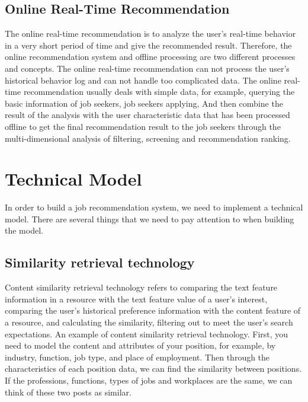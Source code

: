 \documentclass[sigconf]{acmart}
\begin{document}
\subsection{Online Real-Time Recommendation}
The online real-time recommendation is to analyze the user's real-time behavior in a very short period of time and give the recommended result. Therefore, the online recommendation system and offline processing are two different processes and concepts.\cite{Hong2013}  The online real-time recommendation can not process the user's historical behavior log and can not handle too complicated data.\cite{Hong2013}  The online real-time recommendation usually deals with simple data, for example, querying the basic information of job seekers, job seekers applying, And then combine the result of the analysis with the user characteristic data that has been processed offline to get the final recommendation result to the job seekers through the multi-dimensional analysis of filtering, screening and recommendation ranking.


\section{Technical Model}
In order to build a job recommendation system, we need to implement a technical model. There are several things that we need to pay attention to when building the model.

\subsection{Similarity retrieval technology}
Content similarity retrieval technology refers to comparing the text feature information in a resource with the text feature value of a user's interest, comparing the user's historical preference information with the content feature of a resource, and calculating the similarity, filtering out to meet the user's search expectations.\cite{Hong2013}  An example of content similarity retrieval technology. First, you need to model the content and attributes of your position, for example, by industry, function, job type, and place of employment. Then through the characteristics of each position data, we can find the similarity between positions.\cite{Jain2016}  If the professions, functions, types of jobs and workplaces are the same, we can think of these two posts as similar.
\end{document}
